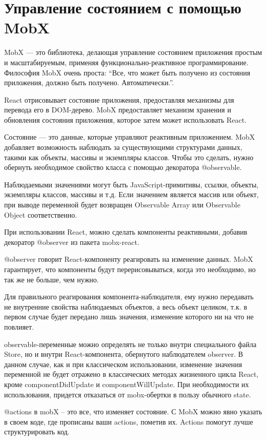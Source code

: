\documentclass[14pt, a4paper]{diplom}
\begin{document}
\section{Управление состоянием с помощью MobX}

MobX — это библиотека, делающая управление состоянием приложения простым и масштабируемым, применяя функционально-реактивное программирование. Философия MobX очень проста:
“Все, что может быть получено из состояния приложения, должно быть получено. Автоматически.”.

React отрисовывает состояние приложения, предоставляя механизмы для перевода его в DOM-дерево. MobX предоставляет механизм хранения и обновления состояния приложения, которое затем может использовать React.

Состояние — это данные, которые управляют реактивным приложением.
MobX добавляет возможность наблюдать за существующими структурами данных, такими как объекты, массивы и экземпляры классов. Чтобы это сделать, нужно обернуть необходимое свойство класса с помощью декоратора @observable.

Наблюдаемыми значениями могут быть JavaScript-примитивы, ссылки, объекты, экземпляры классов, массивы и т.д. Если значением является массив или объект, при выводе переменной будет возвращен Observable Array или Observable Object соответственно.

При использовании React, можно сделать компоненты реактивными, добавив декоратор @observer из пакета mobx-react.

@observer говорит React-компоненту реагировать на изменение данных. MobX гарантирует, что компоненты будут перерисовываться, когда это необходимо, но так же не больше, чем нужно.

Для правильного реагирования компонента-наблюдателя, ему нужно передавать не внутренние свойства наблюдаемых объектов, а весь объект целиком, т.к. в первом случае будет передано лишь значения, изменение которого ни на что не повлияет.

observable-переменные можно определять не только внутри специального файла Store, но и внутри React-компонента, обернутого наблюдателем observer. В данном случае, как и при классическом использовании, изменение значения переменной не будет отражено в классических методах жизненного цикла React, кроме componentDidUpdate и componentWillUpdate. При необходимости их использования, придется отказаться от mobx-обертки в пользу обычного state.

@actions в mobX -- это все, что изменяет состояние. С MobX можно явно указать в своем коде, где прописаны ваши actions, пометив их. Actions помогут лучше структурировать код.
\end{document}
